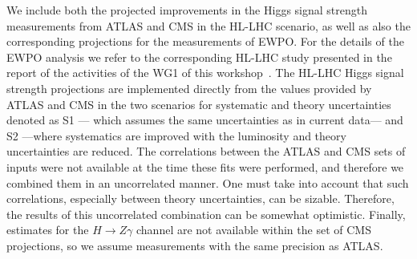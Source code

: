We include both the projected improvements 
in the Higgs signal strength measurements from ATLAS and CMS in the HL-LHC scenario,
as well as also the corresponding projections for the measurements of EWPO.
For the details of the EWPO analysis we refer to the corresponding HL-LHC study 
presented in the report of the activities of the WG1 of this workshop~\cite{Azzi:2650160}.
%
The HL-LHC Higgs signal strength projections are implemented directly from the values
provided by ATLAS and CMS in the two scenarios for systematic and theory uncertainties
denoted as S1 --- which assumes the same uncertainties as in current data--- and S2 ---where systematics
are improved with the luminosity and theory uncertainties are reduced.
%
The correlations between the ATLAS and CMS sets of inputs were not available at the time
these fits were performed, and therefore we combined them in an uncorrelated manner. One must take into 
account that such correlations, especially between theory uncertainties, can be sizable. Therefore,
the results of this uncorrelated combination can be somewhat optimistic.
Finally, estimates for the $H\to Z\gamma$ channel are not available within the set of CMS projections, so we 
assume measurements with the same precision as ATLAS.

